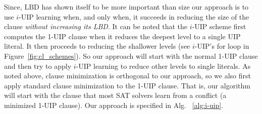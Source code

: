 \documentclass[runningheads]{llncs}
\newcommand{\sat}{SAT\xspace}
\newcommand{\LBD}{\text{LBD}}
\begin{document}
Since, $\LBD$ has shown itself to be more important than size our
approach is to use $i$-UIP learning when, and only when, it succeeds
in reducing the size of the clause \emph{without increasing its
  LBD}. It can be noted that the $i$-UIP scheme first computes the
1-UIP clause when it reduces the deepest level to a single UIP
literal. It then proceeds to reducing the shallower levels (see $i$-UIP's
for loop in Figure~\ref{fig:cl_schemes}). So our approach will start
with the normal 1-UIP clause and then try to apply $i$-UIP learning to
reduce other levels to single literals. As noted above, clause
minimization is orthogonal to our approach, so we also first apply
standard clause minimization \cite{DBLP:conf/sat/SorenssonB09} to the
1-UIP clause. That is, our algorithm will start with the clause that
most \sat solvers learn from a conflict (a minimized 1-UIP
clause). Our approach is specified in Alg. ~\ref{alg:i-uip}.
\end{document}
